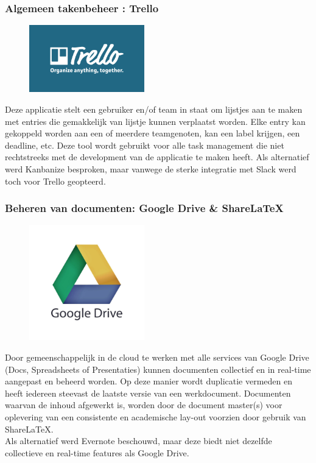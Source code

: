 \documentclass{article}
\begin{document}
\clearpage

\subsubsection*{Algemeen takenbeheer : Trello}

\begin{figure}[h!]
\centering
 \includegraphics[width=50mm]{trello_logo.png}
\end{figure}

\noindent Deze applicatie stelt een gebruiker en/of team in staat om lijstjes aan te maken met entries die gemakkelijk van lijstje kunnen verplaatst worden. Elke entry kan gekoppeld worden aan een of meerdere teamgenoten, kan een label krijgen, een deadline, etc. Deze tool wordt gebruikt voor alle task management die niet rechtstreeks met de development van de applicatie te maken heeft. 
\noindent Als alternatief werd Kanbanize besproken, maar vanwege de sterke integratie met Slack werd toch voor Trello geopteerd.


\clearpage

\subsubsection*{Beheren van documenten: Google Drive \& Share\LaTeX}

\begin{figure}[h!]
\centering
 \includegraphics[width=50mm]{google_drive.jpg}
\end{figure}

\noindent Door gemeenschappelijk in de cloud te werken met alle services van Google Drive (Docs, Spreadsheets of Presentaties) kunnen documenten collectief en in real-time aangepast en beheerd worden. Op deze manier wordt duplicatie vermeden en heeft iedereen steevast de laatste versie van een werkdocument. Documenten waarvan de inhoud afgewerkt is, worden door de document master(s) voor oplevering van een consistente en academische lay-out voorzien door gebruik van Share\LaTeX.\\
Als alternatief werd Evernote beschouwd, maar deze biedt niet dezelfde collectieve en real-time features als Google Drive. 
 
\end{document}
